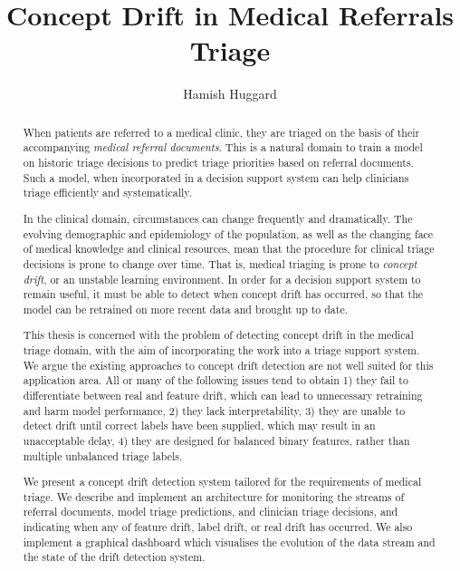 \documentclass[12pt,examcopy]{uathesis}
\begin{document}
\title{Concept Drift in Medical Referrals Triage}
\author{Hamish Huggard}
\maketitle

\frontmatter
\begin{abstract}
When patients are referred to a medical clinic, they are triaged on the basis of their accompanying {\it medical referral documents}. This is a natural domain to train a model on historic triage decisions to predict triage priorities based on referral documents. Such a model, when incorporated in a decision support system can help clinicians triage efficiently and systematically.

In the clinical domain, circumstances can change frequently and dramatically. The evolving demographic and epidemiology of the population, as well as the changing face of medical knowledge and clinical resources, mean that the procedure for clinical triage decisions is prone to change over time. That is, medical triaging is prone to {\it concept drift}, or an unstable learning environment. In order for a decision support system to remain useful, it must be able to detect when concept drift has occurred, so that the model can be retrained on more recent data and brought up to date.

This thesis is concerned with the problem of detecting concept drift in the medical triage domain, with the aim of incorporating the work into a triage support system. We argue the existing approaches to concept drift detection are not well suited for this application area. All or many of the following issues tend to obtain 1) they fail to differentiate between real and feature drift, which can lead to unnecessary retraining and harm model performance, 2) they lack interpretability, 3) they are unable to detect drift until correct labels have been supplied, which may result in an unacceptable delay, 4) they are designed for balanced binary features, rather than multiple unbalanced triage labels.

We present a concept drift detection system tailored for the requirements of medical triage. We describe and implement an architecture for monitoring the streams of referral documents, model triage predictions, and clinician triage decisions, and indicating when any of feature drift, label drift, or real drift has occurred. We also implement a graphical dashboard which visualises the evolution of the data stream and the state of the drift detection system. 


\end{abstract}
\end{document}
